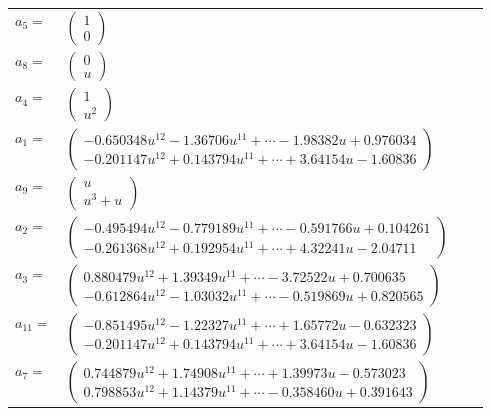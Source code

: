 \documentclass[1p]{elsarticle_modified}
\theoremstyle{definition}
\begin{document}
\begin{tabular}{m{7pt} m{180pt} m{7pt} m{180pt} }
\flushright $a_{5}=$&$\begin{pmatrix}1\\0\end{pmatrix}$ \\
\flushright $a_{8}=$&$\begin{pmatrix}0\\u\end{pmatrix}$ \\
\flushright $a_{4}=$&$\begin{pmatrix}1\\u^2\end{pmatrix}$ \\
\flushright $a_{1}=$&$\begin{pmatrix}-0.650348 u^{12}-1.36706 u^{11}+\cdots-1.98382 u+0.976034\\-0.201147 u^{12}+0.143794 u^{11}+\cdots+3.64154 u-1.60836\end{pmatrix}$ \\
\flushright $a_{9}=$&$\begin{pmatrix}u\\u^3+u\end{pmatrix}$ \\
\flushright $a_{2}=$&$\begin{pmatrix}-0.495494 u^{12}-0.779189 u^{11}+\cdots-0.591766 u+0.104261\\-0.261368 u^{12}+0.192954 u^{11}+\cdots+4.32241 u-2.04711\end{pmatrix}$ \\
\flushright $a_{3}=$&$\begin{pmatrix}0.880479 u^{12}+1.39349 u^{11}+\cdots-3.72522 u+0.700635\\-0.612864 u^{12}-1.03032 u^{11}+\cdots-0.519869 u+0.820565\end{pmatrix}$ \\
\flushright $a_{11}=$&$\begin{pmatrix}-0.851495 u^{12}-1.22327 u^{11}+\cdots+1.65772 u-0.632323\\-0.201147 u^{12}+0.143794 u^{11}+\cdots+3.64154 u-1.60836\end{pmatrix}$ \\
\flushright $a_{7}=$&$\begin{pmatrix}0.744879 u^{12}+1.74908 u^{11}+\cdots+1.39973 u-0.573023\\0.798853 u^{12}+1.14379 u^{11}+\cdots-0.358460 u+0.391643\end{pmatrix}$ \\

\end{tabular}
\end{document}
